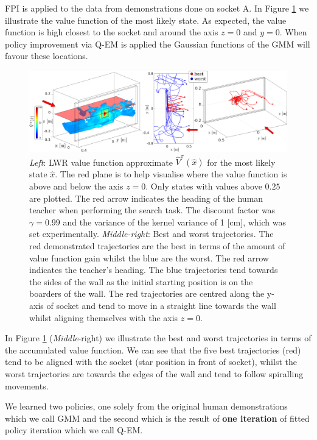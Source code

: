 \documentclass[final,3p,times,twocolumn]{elsarticle}
\begin{document}
FPI is applied to the data from demonstrations done on socket A. In Figure \ref{fig:ch4:Figure1}  we illustrate the value function 
of the most likely state. As expected, the value function is high closest to the socket and around the axis $z=0$ and $y=0$. 
When policy improvement via Q-EM is applied the Gaussian functions of the GMM will favour these locations. 

\begin{figure}
 \centering
 \includegraphics[width=\linewidth]{./Figure/value_function_belief.pdf}
 \caption{\textit{Left}: LWR value function approximate $\hat{V}^{\pi}(\hat{x})$ for the most likely state $\hat{x}$. 
 The red plane is to help visualise where the value function is above and below the axis $z=0$. Only states with values above
 $0.25$ are plotted.  The red arrow indicates the heading of the human teacher when performing the search task. The discount 
 factor was $\gamma=0.99$ and the variance of the kernel variance of 1 [cm], which was set experimentally.
 \textit{Middle-right}: Best and worst trajectories. The red demonstrated trajectories are the best in terms of the amount of value function 
 gain whilst the blue are the worst. The red arrow indicates the teacher's heading. The blue trajectories tend 
 towards the sides of the wall as the initial starting position is on the boarders of the wall. The red trajectories are centred along the y-axis of socket and tend to move in a straight line towards 
 the wall whilst aligning themselves with the axis $z=0$.
}
 \label{fig:ch4:Figure1}
\end{figure}

In Figure \ref{fig:ch4:Figure1} (\textit{Middle}-right) we illustrate the best and worst trajectories in terms of the accumulated value function.
We can see that the five best trajectories (red) tend to be aligned with the socket (star position in front of socket), 
whilst the worst trajectories are towards the edges of the wall and tend to follow spiralling movements. 

We learned two policies, one solely from the original human demonstrations which we call GMM and the second which 
is the result of \textbf{one iteration} of fitted policy iteration which we call Q-EM. 
\end{document}
